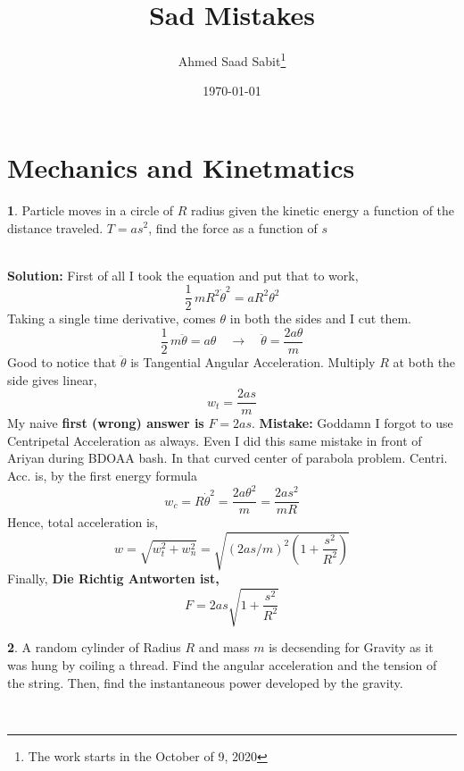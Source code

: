 \documentclass[a4paper]{article}
\title{Sad Mistakes}
\author{Ahmed Saad Sabit\footnote{The work starts in the October of 9, 2020}}
\date{\today}
\theoremstyle{definition}
\newtheorem{prob}{ \framebox[0.09\textwidth]{{\sffamily Pr}} }
\newcommand{\pr}[1]{ \begin{tcolorbox} \begin{prob} 
    #1 
\end{prob} 
   \end{tcolorbox}\ 
   \\
 }
\begin{document}
\section{\textsf{Mechanics and Kinetmatics}}
\pr{Particle moves in a circle of $R$ radius given the kinetic energy
a function of the distance traveled. $T = as^2$, find the force as a function of $s$}
\textbf{Solution:} 
First of all I took the equation and put that to work,
    \begin{equation}
    \frac{1}{2} \, mR^2 \dot{\theta}^2 = a R^2 \theta^2
    \end{equation}
    Taking a single time derivative, comes $\theta$ in both the sides and I cut them. 
    \begin{equation}
        \frac{1}{2} \, m \ddot{\theta} = a \theta \quad \rightarrow \quad \ddot{\theta} = \frac{2a\theta}{m}
    \end{equation}
    Good to notice that $\ddot{\theta}$ is Tangential Angular Acceleration.
    Multiply $R$ at both the side gives linear,
    \begin{equation}
    w_t = \frac{2as}{m}
    \end{equation}
    My naive \textbf{first (wrong) answer is} $F = 2as$.
    \textbf{Mistake:} Goddamn I forgot to use Centripetal Acceleration as always. Even I did this same mistake in front of Ariyan during BDOAA bash. In that curved center of parabola problem.
    Centri. Acc. is, by the first energy formula
    \begin{equation}
    w_c = R \dot{\theta}^2 = \frac{2a \theta^2}{m} = \frac{2a s^2}{mR}
    \end{equation}
    Hence, total acceleration is,
    \begin{equation}
    w = \sqrt{w_t ^2 + w_n ^2} = \sqrt{ (2as/m)^2 \left(1 + \frac{s^2}{R^2}\right) }
    \end{equation}
    Finally, \textbf{Die Richtig Antworten ist,}
    \begin{equation}
    F = 2as  \sqrt{1 + \frac{s^2}{R^2}}
    \end{equation}
\begin{center}
 \end{center}
\pr{A random cylinder of Radius $R$ and mass $m$ is decsending for Gravity as it was hung by coiling a thread. Find the angular
acceleration and the tension of the string. Then, find the instantaneous power developed by the gravity.}
\end{document}
